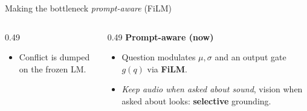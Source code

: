 \documentclass[aspectratio=169,11pt]{beamer}
\begin{document}
\begin{frame}{Making the bottleneck \emph{prompt-aware} (FiLM)}
\begin{columns}[T]
\begin{column}{0.49\textwidth}
\begin{itemize}
\item Conflict is dumped on the frozen LM.
\end{itemize}
\end{column}
\begin{column}{0.49\textwidth}
\textbf{Prompt-aware (now)}
\begin{itemize}\scriptsize
\item Question modulates $\mu,\sigma$ and an output gate $g(q)$ via \textbf{FiLM}.
\item \emph{Keep audio when asked about sound}, vision when asked about looks: \textbf{selective} grounding.
\end{itemize}
\end{column}
\end{columns}
\end{frame}
\end{document}
